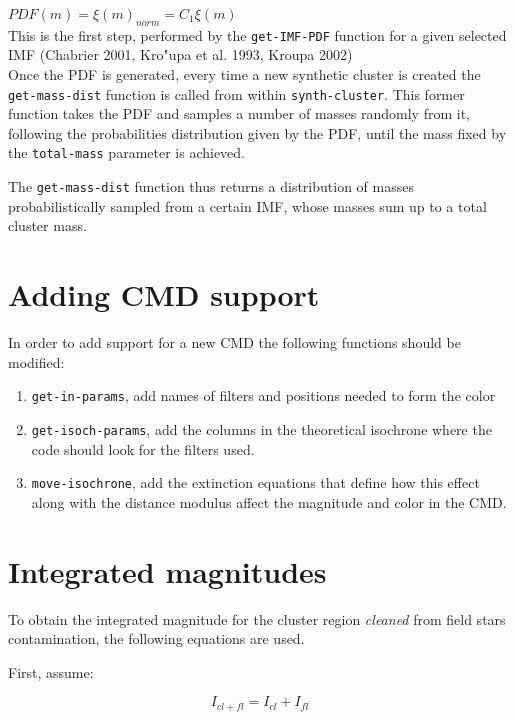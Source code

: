 \documentclass[10pt]{article}
\begin{document}
$PDF(m) = \xi(m)_{norm} = C_1 \xi(m) $\\

This is the first step, performed by the \texttt{get-IMF-PDF} function for a given selected
IMF (Chabrier 2001, Kro"upa et al. 1993, Kroupa 2002)\\


Once the PDF is generated, every time a new synthetic cluster is created the
\texttt{get-mass-dist} function is called from within \texttt{synth-cluster}. This
former function takes the PDF and samples a number of masses randomly from it, following
the probabilities distribution given by the PDF, until the mass fixed by the
\texttt{total-mass} parameter is achieved.

The \texttt{get-mass-dist} function thus returns a distribution of masses probabilistically
sampled from a certain IMF, whose masses sum up to a total cluster mass.


\section{Adding CMD support}

In order to add support for a new CMD the following functions should be modified:
\begin{enumerate}
\item \texttt{get-in-params}, add names of filters and positions needed to form the color
\item \texttt{get-isoch-params}, add the columns in the theoretical isochrone
where the code should look for the filters used.
\item \texttt{move-isochrone}, add the extinction equations that define how
this effect along with the distance modulus affect the magnitude and color
in the CMD.
\end{enumerate}

\section{Integrated magnitudes}

To obtain the integrated magnitude for the cluster region \textit{cleaned}
from field stars contamination, the following equations are used.

First, assume:

\begin{equation}
I_{cl+fl} = I_{cl} + I_{fl}
\label{eq:integ-cl-fl}
\end{equation}
\end{document}
